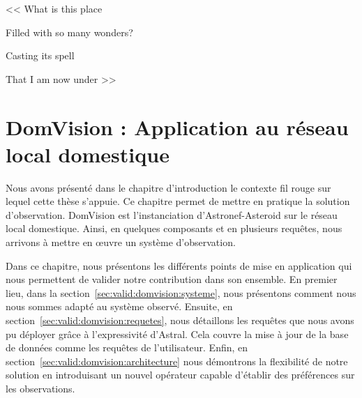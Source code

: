 \begin{savequote}[6cm]
<< What is this place

Filled with so many wonders?

Casting its spell

That I am now under >>

\end{savequote}

\chapter{DomVision : Application au réseau local domestique}\label{chap:valid:domvision}
\chaptertoc
Nous avons présenté dans le chapitre d'introduction le contexte fil rouge sur lequel cette thèse s'appuie. Ce chapitre permet de mettre en pratique la solution d'observation. DomVision est l'instanciation d'Astronef-Asteroid sur le réseau local domestique. Ainsi, en quelques composants et en plusieurs requêtes, nous arrivons à mettre en œuvre un système d'observation.

Dans ce chapitre, nous présentons les différents points de mise en application qui nous permettent de valider notre contribution dans son ensemble. En premier lieu, dans la section~\ref{sec:valid:domvision:systeme}, nous présentons comment nous nous sommes adapté au système observé. Ensuite, en section~\ref{sec:valid:domvision:requetes}, nous détaillons les requêtes que nous avons pu déployer grâce à l'expressivité d'Astral. Cela couvre la mise à jour de la base de données comme les requêtes de l'utilisateur. Enfin, en section~\ref{sec:valid:domvision:architecture} nous démontrons la flexibilité de notre solution en introduisant un nouvel opérateur capable d'établir des préférences sur les observations.





